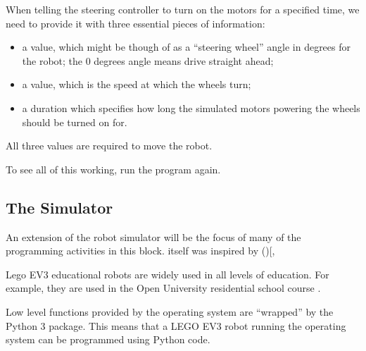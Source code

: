 \documentclass[letterpaper,10pt,english]{sphinxmanual}
\begin{document}
When telling the steering controller to turn on the motors for a specified time, we need to provide it with three essential pieces of information:
\begin{itemize}
\item {} 
a  value, which might be though of as a “steering wheel” angle in degrees for the robot; the 0 degrees angle means drive straight ahead;

\item {} 
a  value, which is the speed at which the wheels turn;

\item {} 
a  duration which specifies how long the simulated motors powering the wheels should be turned on for.

\end{itemize}

All three values are required to move the robot.

To see all of this working, run the program again.


\subsection{The  Simulator}
\label{\detokenize{content/00_SOFTWARE_GUIDE/Section_00_02_ev3devsim_simulator_overview:The-ev3devsim-Simulator}}\label{\detokenize{content/00_SOFTWARE_GUIDE/Section_00_02_ev3devsim_simulator_overview::doc}}
An extension of the  robot simulator will be the focus of many of the programming activities in this block.  itself was inspired by (){[}\sphinxcode{\sphinxupquote{https://www.ev3dev.org/}}{]}, 

Lego EV3 educational robots are widely used in all levels of education. For example, they are used in the Open University residential school course .

Low level functions provided by the  operating system are “wrapped” by the  Python 3 package. This means that a LEGO EV3 robot running the  operating system can be programmed using Python code.
\end{document}
